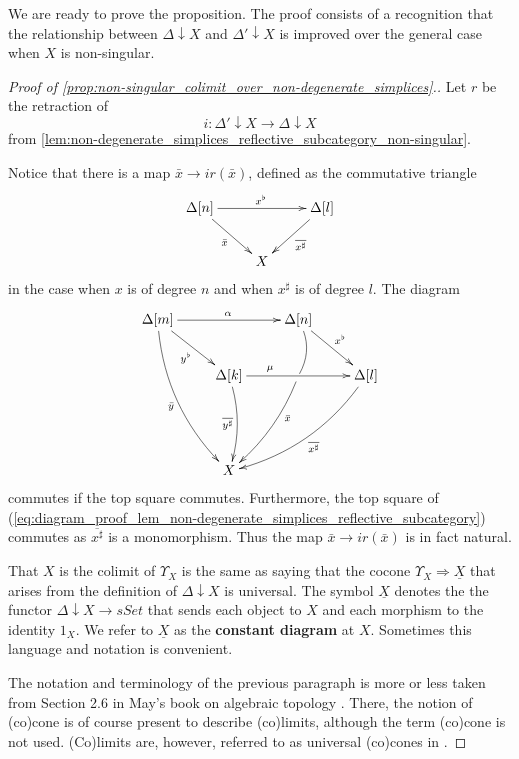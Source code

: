 We are ready to prove the proposition. The proof consists of a recognition that the relationship between $\Delta \downarrow X$ and $\Delta '\downarrow X$ is improved over the general case when $X$ is non-singular.
\begin{proof}[Proof of \cref{prop:non-singular_colimit_over_non-degenerate_simplices}.]
Let $r$ be the retraction of
\[i:\Delta '\downarrow X\to \Delta \downarrow X\]
from \cref{lem:non-degenerate_simplices_reflective_subcategory_non-singular}.

Notice that there is a map $\bar{x} \to ir(\bar{x} )$, defined as the commutative triangle
\begin{displaymath}
\xymatrix{
\Delta [n] \ar[dr]_{\bar{x} } \ar[rr]^{x^\flat } && \Delta [l] \ar[ld]^{\overline{x^\sharp } } \\
& X
}
\end{displaymath}
in the case when $x$ is of degree $n$ and when $x^\sharp$ is of degree $l$. The diagram
\begin{equation}
\label{eq:diagram_proof_lem_non-degenerate_simplices_reflective_subcategory}
\begin{gathered}
\xymatrix{
\Delta [m] \ar@/_1pc/[dddr]_{\bar{y} } \ar[dr]_{y^\flat } \ar[rr]^{\alpha } && \Delta [n] \ar@{-}@/^/[d] \ar[dr]^{x^\flat } \\
& \Delta [k] \ar@/^/[dd]_{\overline{y^\sharp } } \ar[rr]^(.3)\mu & \ar@/^/[ldd]^(.35){\bar{x} } & \Delta [l] \ar@/^1pc/[lldd]^{\overline{x^\sharp } } \\
\\
& X
}
\end{gathered}
\end{equation}
commutes if the top square commutes. Furthermore, the top square of (\ref{eq:diagram_proof_lem_non-degenerate_simplices_reflective_subcategory}) commutes as $\overline{x^\sharp }$ is a monomorphism. Thus the map $\bar{x} \to ir(\bar{x} )$ is in fact natural.

That $X$ is the colimit of $\Upsilon _X$ is the same as saying that the cocone $\Upsilon _X\Rightarrow \underline{X}$ that arises from the definition of $\Delta \downarrow X$ is universal. The symbol $\underline{X}$ denotes the the functor $\Delta \downarrow X\to sSet$ that sends each object to $X$ and each morphism to the identity $1_X$. We refer to $\underline{X}$ as the \textbf{constant diagram} at $X$. Sometimes this language and notation is convenient.

The notation and terminology of the previous paragraph is more or less taken from Section 2.6 in May's book on algebraic topology \cite{Ma99}. There, the notion of (co)cone is of course present to describe (co)limits, although the term (co)cone is not used. (Co)limits are, however, referred to as universal (co)cones in \cite{Bo94}.


\end{proof}
